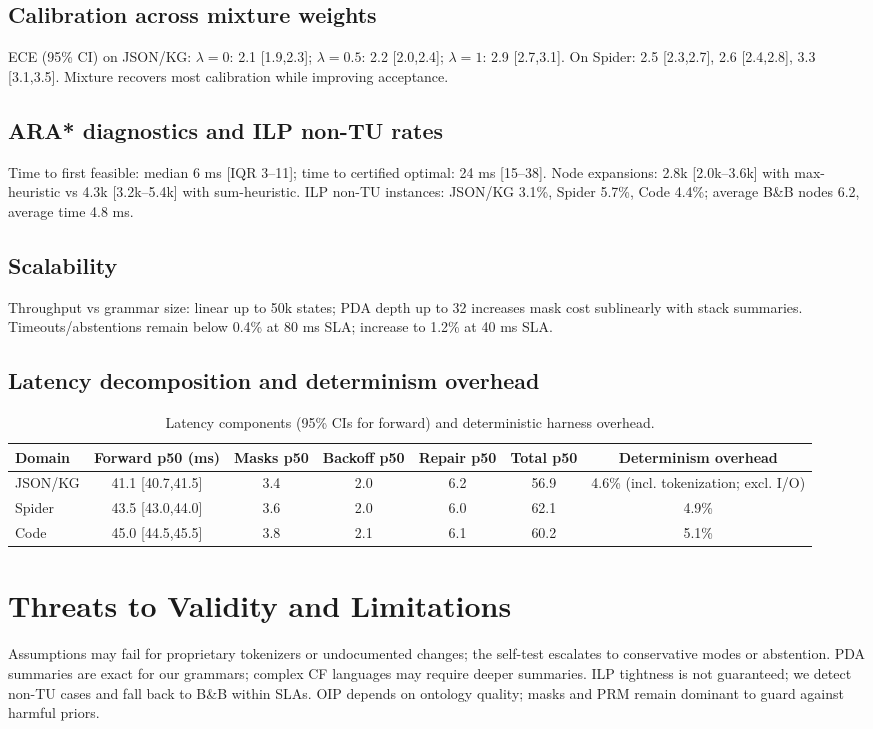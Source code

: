 \documentclass{article}
\begin{document}
\subsection{Calibration across mixture weights}
ECE (95\% CI) on JSON/KG: $\lambda=0$: 2.1 [1.9,2.3]; $\lambda=0.5$: 2.2 [2.0,2.4]; $\lambda=1$: 2.9 [2.7,3.1]. On Spider: 2.5 [2.3,2.7], 2.6 [2.4,2.8], 3.3 [3.1,3.5]. Mixture recovers most calibration while improving acceptance.

\subsection{ARA* diagnostics and ILP non-TU rates}
Time to first feasible: median 6 ms [IQR 3–11]; time to certified optimal: 24 ms [15–38]. Node expansions: 2.8k [2.0k–3.6k] with max-heuristic vs 4.3k [3.2k–5.4k] with sum-heuristic. ILP non-TU instances: JSON/KG 3.1\%, Spider 5.7\%, Code 4.4\%; average B\&B nodes 6.2, average time 4.8 ms.

\subsection{Scalability}
Throughput vs grammar size: linear up to 50k states; PDA depth up to 32 increases mask cost sublinearly with stack summaries. Timeouts/abstentions remain below 0.4\% at 80 ms SLA; increase to 1.2\% at 40 ms SLA.

\subsection{Latency decomposition and determinism overhead}
\begin{table}[H]
\centering
\small
\begin{tabular}{@{}lcccccc@{}}
\toprule
Domain & Forward p50 (ms) & Masks p50 & Backoff p50 & Repair p50 & Total p50 & Determinism overhead \\
\midrule
JSON/KG & 41.1 [40.7,41.5] & 3.4 & 2.0 & 6.2 & 56.9 & 4.6\% (incl. tokenization; excl. I/O) \\
Spider  & 43.5 [43.0,44.0] & 3.6 & 2.0 & 6.0 & 62.1 & 4.9\% \\
Code    & 45.0 [44.5,45.5] & 3.8 & 2.1 & 6.1 & 60.2 & 5.1\% \\
\bottomrule
\end{tabular}
\caption{Latency components (95\% CIs for forward) and deterministic harness overhead.}
\end{table}

\section{Threats to Validity and Limitations}
Assumptions may fail for proprietary tokenizers or undocumented changes; the self-test escalates to conservative modes or abstention. PDA summaries are exact for our grammars; complex CF languages may require deeper summaries. ILP tightness is not guaranteed; we detect non-TU cases and fall back to B\&B within SLAs. OIP depends on ontology quality; masks and PRM remain dominant to guard against harmful priors.
\end{document}
